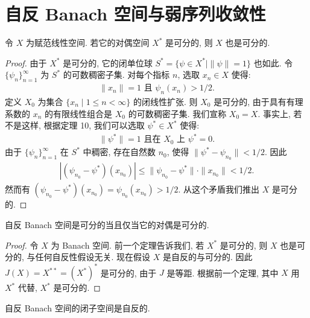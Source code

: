 \documentclass[../../main.tex]{subfiles}
\begin{document}
\section{自反 Banach 空间与弱序列收敛性}\label{section:ch14-自反弱序列}

\begin{theorem}\label{theorem:ch14-对偶可分}
令 $X$ 为赋范线性空间. 若它的对偶空间 $X^{*}$ 是可分的, 则 $X$ 也是可分的.
\end{theorem}

\begin{proof}
由于 $X^{*}$ 是可分的, 它的闭单位球 $S^{*}=\{\psi\in X^{*}\mid\|\psi\|=1\}$ 也如此. 令 $\{\psi_{n}\}_{n=1}^{\infty}$ 为 $S^{*}$ 的可数稠密子集. 对每个指标 $n$, 选取 $x_{n}\in X$ 使得:
\begin{align*}
\|x_{n}\|=1\text{ 且 }\psi_{n}(x_{n})>1/2.
\end{align*}
定义 $X_{0}$ 为集合 $\{x_{n}\mid 1\leqslant n<\infty\}$ 的闭线性扩张. 则 $X_{0}$ 是可分的, 由于具有有理系数的 $x_{n}$ 的有限线性组合是 $X_{0}$ 的可数稠密子集. 我们宣称 $X_{0}=X$. 事实上, 若不是这样, 根据定理 10, 我们可以选取 $\psi^{*}\in X^{*}$ 使得:
\begin{align*}
\|\psi^{*}\|=1\text{ 且在 }X_{0}\text{ 上 }\psi^{*}=0.
\end{align*}
由于 $\{\psi_{n}\}_{n=1}^{\infty}$ 在 $S^{*}$ 中稠密, 存在自然数 $n_{0}$, 使得 $\|\psi^{*}-\psi_{n_{0}}\|<1/2$. 因此
\begin{align*}
|(\psi_{n_{0}}-\psi^{*})(x_{n_{0}})|\leqslant\|\psi_{n_{0}}-\psi^{*}\|\cdot\|x_{n_{0}}\|<1/2.
\end{align*}
然而有 $(\psi_{n_{0}}-\psi^{*})(x_{n_{0}})=\psi_{n_{0}}(x_{n_{0}})>1/2$. 从这个矛盾我们推出 $X$ 是可分的.
\end{proof}

\begin{corollary}\label{corollary:ch14-自反可分}
自反 Banach 空间是可分的当且仅当它的对偶是可分的.
\end{corollary}

\begin{proof}
令 $X$ 为 Banach 空间. 前一个定理告诉我们, 若 $X^{*}$ 是可分的, 则 $X$ 也是可分的, 与任何自反性假设无关. 现在假设 $X$ 是自反的与可分的. 因此 $J(X)=X^{**}=(X^{*})^{*}$ 是可分的, 由于 $J$ 是等距. 根据前一个定理, 其中 $X$ 用 $X^{*}$ 代替, $X^{*}$ 是可分的.
\end{proof}

\begin{proposition}\label{proposition:ch14-自反子空间}
自反 Banach 空间的闭子空间是自反的.
\end{proposition}
\end{document}
